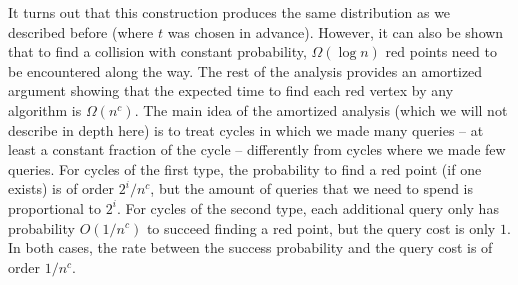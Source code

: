 \documentclass[11pt]{article}
\numberwithin{equation}{section}
\newcommand{\1}{\mathbf{1}}
\begin{document}
It turns out that this construction produces the same distribution as we described before (where $t$ was chosen in advance). However, it can also be shown that to find a collision with constant probability, $\Omega(\log n)$ red points need to be encountered along the way. The rest of the analysis provides an amortized argument showing that the expected time to find each red vertex by any algorithm is $\Omega(n^{c})$. The main idea of the amortized analysis (which we will not describe in depth here) is to treat cycles in which we made many queries -- at least a constant fraction of the cycle -- differently from cycles where we made few queries. For cycles of the first type, the probability to find a red point (if one exists) is of order $2^i / n^c$, but the amount of queries that we need to spend is proportional to $2^i$. For cycles of the second type, each additional query only has probability $O(1 / n^c)$ to succeed finding a red point, but the query cost is only $1$. In both cases, the rate between the success probability and the query cost is of order $1/n^{c}$.
\end{document}
